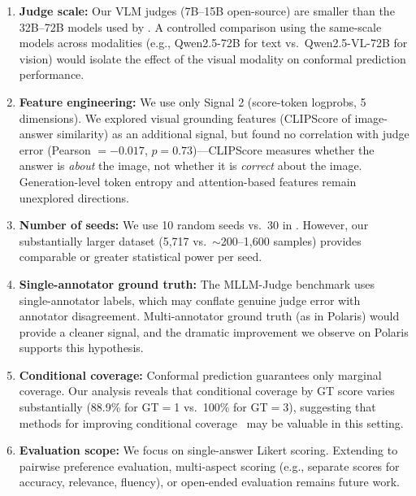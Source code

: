 \documentclass{article}
\begin{document}
\begin{enumerate}[leftmargin=*,itemsep=1pt,topsep=2pt]
\item \textbf{Judge scale:} Our VLM judges (7B--15B open-source) are smaller than the 32B--72B models used by \citet{sheng2025analyzing}. A controlled comparison using the same-scale models across modalities (e.g., Qwen2.5-72B for text vs.\ Qwen2.5-VL-72B for vision) would isolate the effect of the visual modality on conformal prediction performance.

\item \textbf{Feature engineering:} We use only Signal 2 (score-token logprobs, 5 dimensions). We explored visual grounding features (CLIPScore of image-answer similarity) as an additional signal, but found no correlation with judge error (Pearson $= -0.017$, $p = 0.73$)---CLIPScore measures whether the answer is \emph{about} the image, not whether it is \emph{correct} about the image. Generation-level token entropy and attention-based features remain unexplored directions.

\item \textbf{Number of seeds:} We use 10 random seeds vs.\ 30 in \citet{sheng2025analyzing}. However, our substantially larger dataset (5,717 vs.\ $\sim$200--1,600 samples) provides comparable or greater statistical power per seed.

\item \textbf{Single-annotator ground truth:} The MLLM-Judge benchmark uses single-annotator labels, which may conflate genuine judge error with annotator disagreement. Multi-annotator ground truth (as in Polaris) would provide a cleaner signal, and the dramatic improvement we observe on Polaris supports this hypothesis.

\item \textbf{Conditional coverage:} Conformal prediction guarantees only marginal coverage. Our analysis reveals that conditional coverage by GT score varies substantially (88.9\% for GT$=$1 vs.\ 100\% for GT$=$3), suggesting that methods for improving conditional coverage~\citep{angelopoulos2022conformal} may be valuable in this setting.

\item \textbf{Evaluation scope:} We focus on single-answer Likert scoring. Extending to pairwise preference evaluation, multi-aspect scoring (e.g., separate scores for accuracy, relevance, fluency), or open-ended evaluation remains future work.
\end{enumerate}
\end{document}
